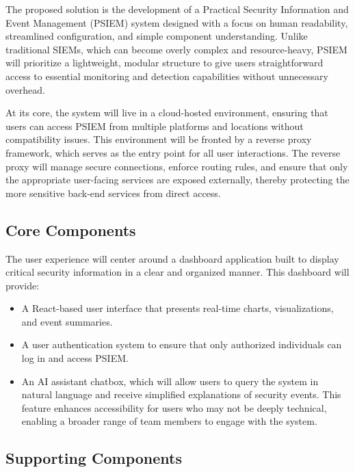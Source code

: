 The proposed solution is the development of a Practical Security Information and Event Management (PSIEM) system designed with a focus on human readability, streamlined configuration, and simple component understanding. Unlike traditional SIEMs, which can become overly complex and resource-heavy, PSIEM will prioritize a lightweight, modular structure to give users straightforward access to essential monitoring and detection capabilities without unnecessary overhead.

At its core, the system will live in a cloud-hosted environment, ensuring that users can access PSIEM from multiple platforms and locations without compatibility issues. This environment will be fronted by a reverse proxy framework, which serves as the entry point for all user interactions. The reverse proxy will manage secure connections, enforce routing rules, and ensure that only the appropriate user-facing services are exposed externally, thereby protecting the more sensitive back-end services from direct access.

\subsection{Core Components}

The user experience will center around a dashboard application built to display critical security information in a clear and organized manner. This dashboard will provide:

\begin{itemize}
    \item A React-based user interface that presents real-time charts, visualizations, and event summaries.
    
    \item A user authentication system to ensure that only authorized individuals can log in and access PSIEM.
    
    \item An AI assistant chatbox, which will allow users to query the system in natural language and receive simplified explanations of security events. This feature enhances accessibility for users who may not be deeply technical, enabling a broader range of team members to engage with the system.
\end{itemize}

\subsection{Supporting Components}


